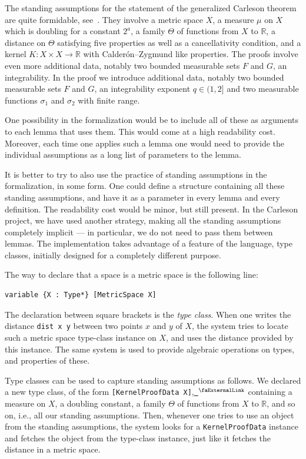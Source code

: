 \documentclass[12pt, reqno]{amsart}
\newcounter{lstlisting}[section]
\let\lean\lstinline
\newcommand*{\real}{\mathbb{R}} %
\newcommand{\extlink}{~\ensuremath{{}^\text{\faExternalLink}}}
\theoremstyle{definition}
\theoremstyle{plain}
\begin{document}
The standing assumptions for the statement of the generalized
Carleson theorem are quite formidable,
see~.
They involve a metric space $X$, a measure $\mu$ on $X$ which is
doubling for a constant $2^a$, a family $\Theta$ of functions from $X$ to
$\real$, a distance on $\Theta$ satisfying five properties as well as a
cancellativity condition, and a kernel $K\colon X \times X \to \real$ with
Calderón--Zygmund like properties. The proofs involve even more additional
data, notably two bounded measurable sets $F$ and $G$, an integrability.
In the proof we introduce additional data,
notably two bounded measurable sets $F$ and $G$, an integrability
exponent $q\in (1, 2]$ and two measurable functions $\sigma_1$ and
$\sigma_2$ with finite range.

One possibility in the formalization would be to include
all of these as arguments to each lemma that uses them.
This would come at a high readability cost. Moreover, each time
one applies such a lemma one would need to provide the individual assumptions
as a long list of parameters to the lemma.

It is better to try to also use the practice of
standing assumptions in the formalization, in some form. One could define a
structure containing all these standing assumptions, and have it as a
parameter in every lemma and every definition. The readability cost would be
minor, but still present. In the Carleson project, we have used another
strategy, making all the standing assumptions completely implicit --- in
particular, we do not need to pass them between lemmas. The implementation
takes advantage of a feature of the language, type classes, initially designed
for a completely different purpose.

The way to declare that a space is a metric space is the following line:
\begin{lstlisting}[mathescape]
variable {X : Type*} [MetricSpace X]
\end{lstlisting}

The declaration between square brackets is the \emph{type class}. When one writes the
distance \texttt{dist x y} between two points $x$ and $y$ of $X$, the system
tries to locate such a metric space type-class instance on $X$, and uses the distance
provided by this instance. The same system is used to provide algebraic
operations on types, and properties of these.

Type classes can be used to capture standing assumptions as follows.
We declared a new type class, of the form \lean{[KernelProofData X]},\href{https://github.com/fpvandoorn/carleson/blob/AFM-frozen/Carleson/Defs.lean#L261-L266}{\extlink}
containing a measure on $X$,
a doubling constant, a family $\Theta$ of functions from $X$ to
$\real$, and so on, i.e., all our standing assumptions. Then, whenever one
tries to use an object from the standing assumptions, the system looks for a
\lean{KernelProofData} instance and fetches the object from the type-class
instance, just like it fetches the distance in a metric space.
\end{document}
